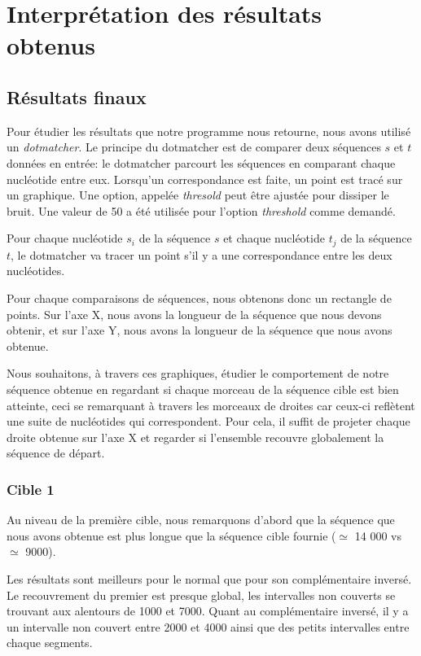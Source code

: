 
\section{Interprétation des résultats obtenus}

\subsection{Résultats finaux}

Pour étudier les résultats que notre programme nous retourne, nous avons utilisé
un \textit{dotmatcher}.
Le principe du dotmatcher est de comparer deux séquences $s$ et $t$ données en
entrée: le dotmatcher parcourt les séquences en comparant chaque nucléotide
entre eux.  Lorsqu'un correspondance est faite, un point est tracé sur un
graphique. Une option, appelée \textit{thresold} peut être ajustée pour dissiper
le bruit. Une valeur de 50 a été utilisée pour l'option \textit{threshold} comme
demandé.

Pour chaque nucléotide $s_{i}$ de la séquence $s$ et chaque nucléotide $t_{j}$
de la séquence $t$, le dotmatcher va tracer un point s'il y a une correspondance
entre les deux nucléotides.

Pour chaque comparaisons de séquences, nous obtenons donc un rectangle de
points. Sur l'axe X, nous avons la longueur de la séquence que nous devons
obtenir, et sur l'axe Y, nous avons la longueur de la séquence que nous avons
obtenue.

Nous souhaitons, à travers ces graphiques, étudier le comportement de notre
séquence obtenue en regardant si chaque morceau de la séquence cible est bien
atteinte, ceci se remarquant à travers les morceaux de droites car ceux-ci
reflètent une suite de nucléotides qui correspondent. Pour cela, il
suffit de projeter chaque droite obtenue sur l'axe X et regarder si l'ensemble
recouvre globalement la séquence de départ.

\subsubsection*{Cible 1}

Au niveau de la première cible, nous remarquons d'abord que la séquence que nous
avons obtenue est plus longue que la séquence cible fournie ($\simeq$ 14 000 vs
$\simeq$ 9000).

Les résultats sont meilleurs pour le normal que pour son complémentaire
inversé. Le recouvrement du premier est presque global, les intervalles non
couverts se trouvant aux alentours de 1000 et 7000. Quant au complémentaire
inversé, il y a un intervalle non couvert entre 2000 et 4000 ainsi que des
petits intervalles entre chaque segments.


